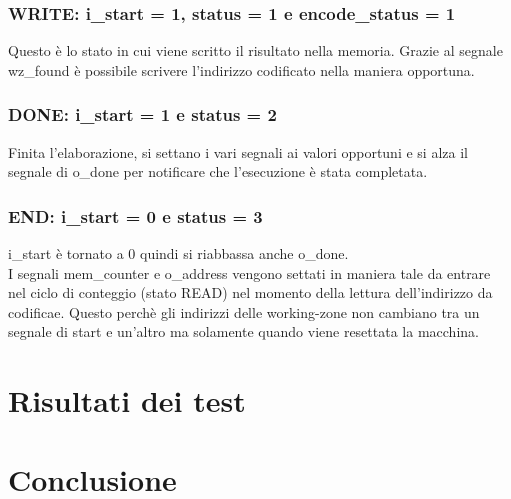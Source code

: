 \documentclass{article}
\begin{document}
\subsubsection{WRITE: {\selectfont i\_start} = 1, {\selectfont status} = 1 e {\selectfont encode\_status} = 1}
Questo è lo stato in cui viene scritto il risultato nella memoria. Grazie al segnale {\selectfont wz\_found} è possibile scrivere l'indirizzo codificato nella maniera opportuna.
\subsubsection{DONE: {\selectfont i\_start} = 1 e {\selectfont status} = 2}
Finita l'elaborazione, si settano i vari segnali ai valori opportuni e si alza il segnale di {\selectfont o\_done} per notificare che l'esecuzione è stata completata.
\subsubsection{END: {\selectfont i\_start} = 0 e {\selectfont status} = 3}
{\selectfont i\_start} è tornato a 0 quindi si riabbassa anche {\selectfont o\_done}.\\
I segnali {\selectfont mem\_counter} e {\selectfont o\_address} vengono settati in maniera tale da entrare nel ciclo di conteggio (stato READ) nel momento della lettura dell'indirizzo da codificae. Questo perchè gli indirizzi delle working-zone non cambiano tra un segnale di start e un'altro ma solamente quando viene resettata la macchina.
\pagebreak
\section{Risultati dei test}
\section{Conclusione}
\end{document}
